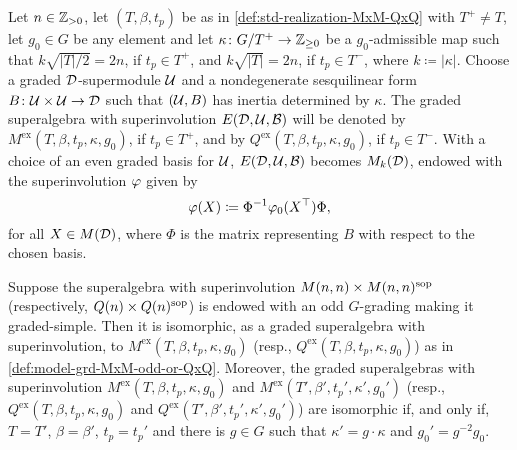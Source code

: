 \begin{defi}\label{def:model-grd-MxM-odd-or-QxQ}
    Let $n\in \mathbb{Z}_{> 0}$, 
    let $(T, \beta, t_p)$ be as in \cref{def:std-realization-MxM-QxQ} with $T^+ \neq T$, 
    let $g_0 \in G$ be any element and
    let $\kappa\colon G/T^+ \to \mathbb{Z}_{\geq 0}$ be a $g_0$-admissible map such that $k \sqrt{|T|/2} = 2n$, if $t_p \in T^+$, and $k \sqrt{|T|} = 2n$, if $t_p \in T^-$, where $k \coloneqq |\kappa|$.
    Choose a graded $\mathcal{D}$-supermodule $\mathcal U$ and a nondegenerate sesquilinear form $B\colon \mathcal U\times \mathcal U \to \mathcal{D}$ such that $(\mathcal U, B)$ has inertia determined by $\kappa$. 
    The graded superalgebra with superinvolution $E(\mathcal{D}, \mathcal U, \mathcal B)$ will be denoted by $M^{\mathrm{ex}}(T, \beta, t_p, \kappa, g_0)$, if $t_p \in T^+$, and by $Q^{\mathrm{ex}}(T, \beta, t_p, \kappa, g_0)$, if $t_p \in T^-$. 
    With a choice of an even graded basis for $\mathcal U$, $E(\mathcal{D}, \mathcal U, \mathcal B)$ becomes $M_k (\mathcal{D})$, endowed with the superinvolution $\varphi$ given by 
    \[
        \varphi(X) \coloneqq \Phi^{-1} \varphi_0(X^{\top}) \Phi,
    \]
    for all $X \in M(\mathcal{D})$, where $\Phi$ is the matrix representing $B$ with respect to the chosen basis. 
\end{defi}

\begin{thm}\label{thm:MxM-odd}
    Suppose the superalgebra with superinvolution $M(n,n) \times M(n,n)^{\mathrm{sop}}$ (respectively, $Q(n) \times Q(n)^{\mathrm{sop}}$) is endowed with an odd $G$-grading making it graded-simple. 
    Then it is isomorphic, as a graded superalgebra with superinvolution, to $M^{\mathrm{ex}}(T,\beta, t_p, \kappa, g_0)$ (resp., $Q^{\mathrm{ex}}(T,\beta, t_p, \kappa, g_0)$) as in \cref{def:model-grd-MxM-odd-or-QxQ}. 
    Moreover, the graded superalgebras with superinvolution $M^{\mathrm{ex}} (T, \beta,  t_p, \kappa, g_0)$  and $M^{\mathrm{ex}} (T', \beta',  t_p', \kappa', g_0')$ (resp., $Q^{\mathrm{ex}} (T, \beta,  t_p, \kappa, g_0)$ and $Q^{\mathrm{ex}} (T', \beta',  t_p', \kappa', g_0')$) are isomorphic if, and only if, $T =T'$, $\beta = \beta'$, $t_p = t_p'$ and there is $g \in G$ such that $\kappa' = g\cdot\kappa$ and $g_0' = g^{-2}g_0$. 
\end{thm}

